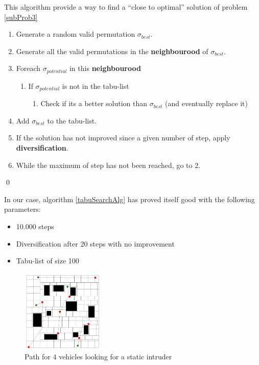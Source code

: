 \begin{algorithm}
  This algorithm provide a way to find a ``close to optimal'' solution of problem \ref{subProb3} 
  \begin{enumerate}
   \item Generate a random valid permutation $\sigma_{best}$.
   \item Generate all the valid permutations in the \textbf{neighbourood} of $\sigma_{best}$.
   \item Foreach $\sigma_{potential}$ in this \textbf{neighbourood}
   \begin{enumerate}
    \item If $\sigma_{potential}$ is not in the tabu-list
    \begin{enumerate}
     \item Check if its a better solution than $\sigma_{best}$ (and eventually replace it)
     \end{enumerate}
   \end{enumerate}
     \item Add $\sigma_{best}$ to the tabu-list.
     \item If the solution has not improved since a given number of step, apply \textbf{diversification}.
   \item While the maximum of step has not been reached, go to 2. 
  \end{enumerate}
   \qed
 \label{tabuSearchAlg}
\end{algorithm}

In our case, algorithm \ref{tabuSearchAlg} has proved itself good with the following parameters:
\begin{itemize}
 \item 10.000 steps
 \item Diversification after 20 steps with no improvement
 \item Tabu-list of size 100
\end{itemize}




\begin{figure}[h!t]
	\begin{center}
	\includegraphics[width=150px]{fig/dynamicPath.jpg}
	\end{center}
	\caption{Path for $4$ vehicles looking for a static intruder}
	\label{dynamicPath}
\end{figure}


